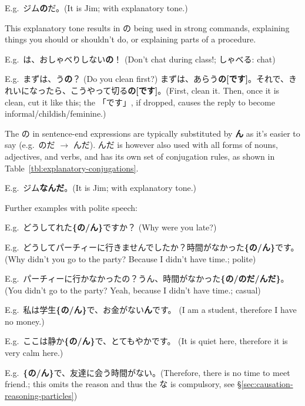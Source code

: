 \documentclass[../nihongo-gakushuu-kyouzai.tex]{subfiles}
\begin{document}
\begin{itemize}
\begin{description}
        E.g.\ ジム\textbf{の}だ。(It is Jim; with explanatory tone.)

        This explanatory tone results in の being used in strong commands, explaining things you should or shouldn't do, or explaining parts of a procedure.

        E.g.\ は、おしゃべりしない\textbf{の}！ (Don't chat during class!; しゃべる: chat)

        E.g.\ まずは、う\textbf{の}？ (Do you clean first?) まずは、あらう\textbf{の[です]}。それで、きれいになったら、こうやって切る\textbf{の[です]}。(First, clean it. Then, once it is clean, cut it like this; the 「です」, if dropped, causes the reply to become informal/childish/feminine.)

        The の in sentence-end expressions are typically substituted by \textbf{ん} as it's easier to say (e.g.\ のだ $\to$ んだ). んだ is however also used with all forms of nouns, adjectives, and verbs, and has its own set of conjugation rules, as shown in Table~\ref{tbl:explanatory-conjugations}.

        E.g.\ ジム\textbf{なんだ}。(It is Jim; with explanatory tone.)

        Further examples with polite speech:

        E.g.\ どうしてれた\textbf{\{の/ん\}}ですか？ (Why were you late?)


        E.g.\ どうしてパーチィーに行きませんでしたか？時間がなかった\textbf{\{の/ん\}}です。 (Why didn't you go to the party? Because I didn't have time.; polite)

        E.g.\ パーチィーに行かなかったの？うん、時間がなかった\textbf{\{の/のだ/んだ\}}。(You didn't go to the party? Yeah, because I didn't have time.; casual)

        E.g.\ 私は学生\textbf{\{の/ん\}}で、お金がない\textbf{ん}です。 (I am a student, therefore I have no money.)

        E.g.\ ここは静か\textbf{\{の/ん\}}で、とてもやかです。 (It is quiet here, therefore it is very calm here.)

        E.g.\ \textbf{\{の/ん\}}で、友達に会う時間がない。(Therefore, there is no time to meet friend.; this omits the reason and thus the な is compulsory, see \S\ref{sec:causation-reasoning-particles})
    \end{description}
\end{itemize}
\end{document}
